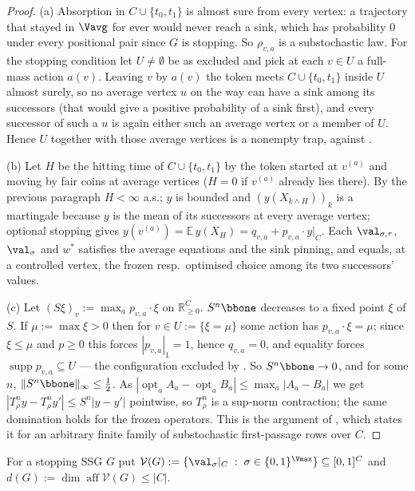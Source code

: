 \begin{proof}
(a) Absorption in $C\cup\{t_0,t_1\}$ is almost sure from every vertex:
a trajectory that stayed in $\Vavg$ for ever would never reach a sink,
which has probability $0$ under every positional pair since $G$ is
stopping.  So $\rho_{v,a}$ is a substochastic law.  For the stopping
condition let $U\ne\emptyset$ be as excluded and pick at each $v\in U$ a
full-mass action $a(v)$.  Leaving $v$ by $a(v)$ the token meets
$C\cup\{t_0,t_1\}$ inside $U$ almost surely, so no average vertex $u$ on
the way can have a sink among its successors (that would give a positive
probability of a sink first), and every successor of such a $u$ is again
either such an average vertex or a member of $U$.  Hence $U$ together with
those average vertices is a nonempty trap, against .

(b) Let $H$ be the hitting time of $C\cup\{t_0,t_1\}$ by the token started
at $v^{(a)}$ and moving by fair coins at average vertices ($H=0$ if
$v^{(a)}$ already lies there).  By the previous paragraph $H<\infty$ a.s.;
$y$ is bounded and $(y(X_{k\wedge H}))_k$ is a martingale because $y$ is
the mean of its successors at every average vertex; optional stopping gives
$y(v^{(a)})=\mathbb E\,y(X_H)=q_{v,a}+p_{v,a}\cdot y|_C$.  Each
$\val_{\sigma,\tau}$, $\val_\sigma$ and $w^\ast$ satisfies the average
equations and the sink pinning, and equals, at a controlled vertex, the
frozen resp.\ optimised choice among its two successors' values.

(c) Let $(S\xi)_v:=\max_a p_{v,a}\cdot\xi$ on $\mathbb R_{\ge0}^{C}$.
$S^{n}\bbone$ decreases to a fixed point $\xi$ of $S$.  If
$\mu:=\max\xi>0$ then for $v\in U:=\{\xi=\mu\}$ some action has
$p_{v,a}\cdot\xi=\mu$; since $\xi\le\mu$ and $p\ge0$ this forces
$|p_{v,a}|_1=1$, hence $q_{v,a}=0$, and equality forces
$\operatorname{supp}p_{v,a}\subseteq U$ --- the configuration excluded by
.  So $S^{n}\bbone\to0$, and for some $n$,
$\lVert S^{n}\bbone\rVert_\infty\le\frac12$.  As
$|\operatorname{opt}_aA_a-\operatorname{opt}_aB_a|\le\max_a|A_a-B_a|$ we get
$|T_\rho^{n}y-T_\rho^{n}y'|\le S^{n}|y-y'|$ pointwise, so $T_\rho^{n}$ is a
sup-norm contraction; the same domination holds for the frozen operators.
This is the argument of , which states it for
an arbitrary finite family of substochastic first-passage rows over $C$.
\end{proof}

\begin{definition}\label{def:qm-dim}
For a stopping SSG $G$ put
$\mathcal V(G):=\{\val_\sigma|_C\;:\;\sigma\in\{0,1\}^{\Vmax}\}\subseteq[0,1]^{C}$
and $d(G):=\dim\operatorname{aff}\mathcal V(G)\le|C|$.
\end{definition}


